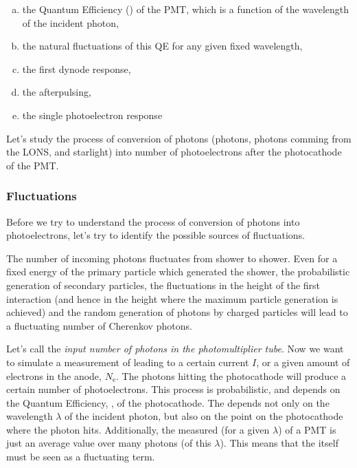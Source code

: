 \begin{enumerate}[a.]
\item the Quantum Efficiency (\QE) of the PMT, which is a function of
  the wavelength of the incident photon,
  
\item the natural fluctuations of this QE for any given fixed
  wavelength,

\item the first dynode response, 

\item the afterpulsing, 
  
\item the single photoelectron response
\end{enumerate}

Let's study the process of conversion of photons (\Cherenkov photons,
photons comming from the LONS, and starlight) into number of
photoelectrons after the photocathode of the PMT.

\subsubsection{Fluctuations}

Before we try to understand the process of conversion of \Cherenkov
photons into photoelectrons, let's try to identify the possible
sources of fluctuations.

The number of incoming \Cherenkov photons fluctuates from shower to
shower. Even for a fixed energy of the primary particle which
generated the shower, the probabilistic generation of secondary
particles, the fluctuations in the height of the first interaction
(and hence in the height where the maximum particle generation is
achieved) and the random generation of \Cherenkov photons by charged
particles will lead to a fluctuating number of Cherenkov photons.

Let's call \Nphot the \emph{input number of photons in the
  photomultiplier tube}. Now we want to simulate a measurement of
\Nphot leading to a certain current $I$, or a given amount of
electrons in the anode, $N_{\mathrm{e}}$. The \Cherenkov photons
hitting the photocathode will produce a certain number of
photoelectrons. This process is probabilistic, and depends on the
Quantum Efficiency, \QE, of the photocathode.  The \QE depends not
only on the wavelength $\lambda$ of the incident photon, but also on
the point on the photocathode where the photon hits.  Additionally,
the measured \QE (for a given $\lambda$) of a PMT is just an average
value over many photons (of this $\lambda$). This means that the \QE
itself must be seen as a fluctuating term.

